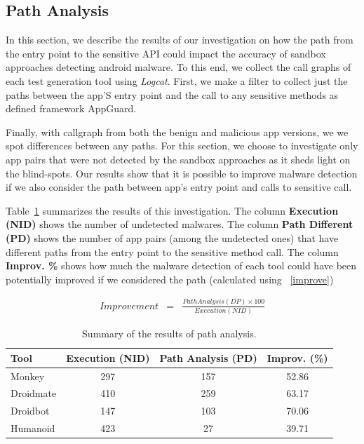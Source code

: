 \subsection{Path Analysis}\label{sec:path}

In this section, we describe the results of our investigation on how the path from the entry point to the sensitive API could impact the accuracy of sandbox approaches detecting android malware. To this end, we collect the call graphs of each test generation tool using \emph{Logcat}. First, we make a filter to collect just the paths between the app'S entry point and the call to any sensitive methods as defined framework AppGuard.

Finally, with callgraph from both the benign and malicious app versions, we we spot differences between any paths. For this section, we choose to investigate only app pairs that were not detected by  the sandbox approaches as it sheds light on the blind-spots. Our results show that it is possible to improve malware detection if we also consider the path between app's entry point and calls to sensitive call.

Table~\ref{tab:pa} summarizes the results of this investigation. The column \textbf{Execution (NID)} shows the number of undetected malwares. The column  \textbf{Path Different (PD)} shows the number of app pairs (among the undetected ones) that have different paths from the entry point to the sensitive method call. The column \textbf{Improv. \%} shows how much the malware detection of each tool could have been potentially improved if we considered the path (calculated using ~\eqref{improve})


\begin{eqnarray}
Improvement & = & \frac{Path Analysis (DP) \times 100}{Execution (NID)} 
\label{improve}
\end{eqnarray}



\begin{table}[h]
  \caption{Summary of the results of path analysis. }
  \centering
  \begin{small}
 \begin{tabular}{lccc}
   \toprule
   Tool & Execution (NID) & Path Analysis (PD) & Improv. (\%) \\   \midrule
   Monkey &  297 & 157 & 52.86 \\ 
   Droidmate &  410 & 259 & 63.17 \\ 
   Droidbot &  147 & 103 & 70.06 \\ 
   Humanoid &  423 & 27 & 39.71 \\ 
 \bottomrule
 \end{tabular}
 \end{small}
 \label{tab:pa}
\end{table}



